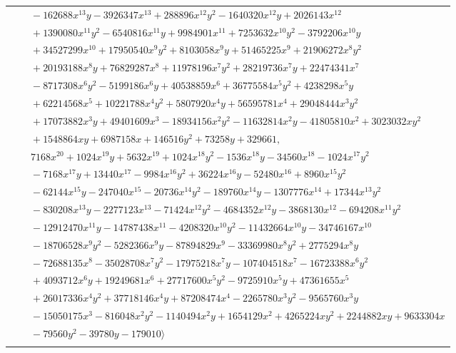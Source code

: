 \documentclass[11pt]{article}
\begin{document}
\begin{longtable}{@{}ll@{}}
 & $\quad -162688x^{13}y-3926347x^{13}+288896x^{12}y^{2}-1640320x^{12}y+2026143x^{12}$\\
 & $\quad +1390080x^{11}y^{2}-6540816x^{11}y+9984901x^{11}+7253632x^{10}y^{2}-3792206x^{10}y$\\
 & $\quad +34527299x^{10}+17950540x^{9}y^{2}+8103058x^{9}y+51465225x^{9}+21906272x^{8}y^{2}$\\
 & $\quad +20193188x^{8}y+76829287x^{8}+11978196x^{7}y^{2}+28219736x^{7}y+22474341x^{7}$\\
 & $\quad -8717308x^{6}y^{2}-5199186x^{6}y+40538859x^{6}+36775584x^{5}y^{2}+4238298x^{5}y$\\
 & $\quad +62214568x^{5}+10221788x^{4}y^{2}+5807920x^{4}y+56595781x^{4}+29048444x^{3}y^{2}$\\
 & $\quad +17073882x^{3}y+49401609x^{3}-18934156x^{2}y^{2}-11632814x^{2}y-41805810x^{2}+3023032xy^{2}$\\
 & $\quad +1548864xy+6987158x+146516y^{2}+73258y+329661,$\\
 & $\quad 7168x^{20}+1024x^{19}y+5632x^{19}+1024x^{18}y^{2}-1536x^{18}y-34560x^{18}-1024x^{17}y^{2}$\\
 & $\quad -7168x^{17}y+13440x^{17}-9984x^{16}y^{2}+36224x^{16}y-52480x^{16}+8960x^{15}y^{2}$\\
 & $\quad -62144x^{15}y-247040x^{15}-20736x^{14}y^{2}-189760x^{14}y-1307776x^{14}+17344x^{13}y^{2}$\\
 & $\quad -830208x^{13}y-2277123x^{13}-71424x^{12}y^{2}-4684352x^{12}y-3868130x^{12}-694208x^{11}y^{2}$\\
 & $\quad -12912470x^{11}y-14787438x^{11}-4208320x^{10}y^{2}-11432664x^{10}y-34746167x^{10}$\\
 & $\quad -18706528x^{9}y^{2}-5282366x^{9}y-87894829x^{9}-33369980x^{8}y^{2}+2775294x^{8}y$\\
 & $\quad -72688135x^{8}-35028708x^{7}y^{2}-17975218x^{7}y-107404518x^{7}-16723388x^{6}y^{2}$\\
 & $\quad +4093712x^{6}y+19249681x^{6}+27717600x^{5}y^{2}-9725910x^{5}y+47361655x^{5}$\\
 & $\quad +26017336x^{4}y^{2}+37718146x^{4}y+87208474x^{4}-2265780x^{3}y^{2}-9565760x^{3}y$\\
 & $\quad -15050175x^{3}-816048x^{2}y^{2}-1140494x^{2}y+1654129x^{2}+4265224xy^{2}+2244882xy+9633304x$\\
 & $\quad -79560y^{2}-39780y-179010\rangle$\\
\addlinespace[2pt]
\multicolumn{2}{@{}p{0.97\textwidth}@{}}{$i=9$, $D_i=4$, $\rho_{ij}$: $8{:}2, \allowbreak 22{:}2, \allowbreak 23{:}2, \allowbreak 29{:}1, \allowbreak 34{:}2, \allowbreak 35{:}2, \allowbreak 38{:}1, \allowbreak 39{:}1$}\\

\end{longtable}
\end{document}

